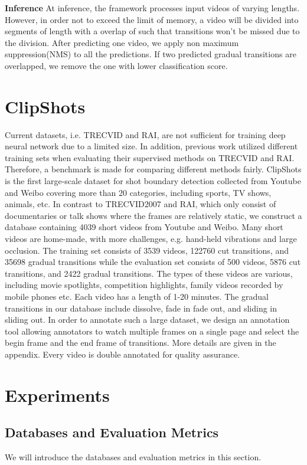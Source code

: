 \documentclass[runningheads]{llncs}
\begin{document}
\textbf{Inference} At inference, the framework processes input videos of varying lengths. However, in order not to exceed the limit of memory, a video will be divided into segments of length  with a overlap of  such that transitions won't be missed due to the division. After predicting one video, we apply non maximum suppression(NMS) to all the predictions. If two predicted gradual transitions are overlapped, we remove the one with lower classification score.

\section{ClipShots}
Current datasets, i.e. TRECVID and RAI, are not sufficient for training deep neural network due to a limited size. In addition, previous work utilized different training sets when evaluating their supervised methods on TRECVID and RAI. Therefore, a benchmark is made for comparing different methods fairly. ClipShots is the first large-scale dataset for shot boundary detection collected from Youtube and Weibo covering more than 20 categories, including sports, TV shows, animals, etc. In contrast to TRECVID2007 and RAI, which only consist of documentaries or talk shows where the frames are relatively static, we construct a database containing 4039 short videos from Youtube and Weibo. Many short videos are home-made, with more challenges, e.g. hand-held vibrations and large occlusion. The training set consists of 3539 videos, 122760 cut transitions, and 35698 gradual transitions while the evaluation set consists of 500 videos, 5876 cut transitions, and 2422 gradual transitions. The types of these videos are various, including movie spotlights, competition highlights, family videos recorded by mobile phones etc. Each video has a length of 1-20 minutes. The gradual transitions in our database include dissolve, fade in fade out, and sliding in sliding out. In order to annotate such a large dataset, we design an annotation tool allowing annotators to watch multiple frames on a single page and select the begin frame and the end frame of transitions. More details are given in the appendix. Every video is double annotated for quality assurance.

\section{Experiments}
\subsection{Databases and Evaluation Metrics}
We will introduce the databases and evaluation metrics in this section.
\end{document}
